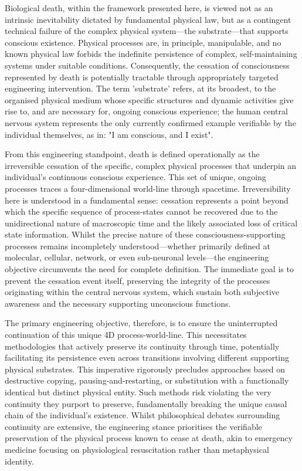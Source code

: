 \documentclass[10pt]{article}
\begin{document}
\begin{sloppypar}
  Biological death, within the framework presented here, is viewed not as an intrinsic inevitability dictated by fundamental physical law, but as a contingent technical failure of the complex physical system—the substrate—that supports conscious existence. Physical processes are, in principle, manipulable, and no known physical law forbids the indefinite persistence of complex, self-maintaining systems under suitable conditions. Consequently, the cessation of consciousness represented by death is potentially tractable through appropriately targeted engineering intervention. The term 'substrate' refers, at its broadest, to the organised physical medium whose specific structures and dynamic activities give rise to, and are necessary for, ongoing conscious experience; the human central nervous system represents the only currently confirmed example verifiable by the individual themselves, as in: "I am conscious, and I exist".

  From this engineering standpoint, death is defined operationally as the irreversible cessation of the specific, complex physical processes that underpin an individual's continuous conscious experience. This set of unique, ongoing processes traces a four-dimensional world-line through spacetime. Irreversibility here is understood in a fundamental sense: cessation represents a point beyond which the specific sequence of process-states cannot be recovered due to the unidirectional nature of macroscopic time and the likely associated loss of critical state information. Whilst the precise nature of these consciousness-supporting processes remains incompletely understood—whether primarily defined at molecular, cellular, network, or even sub-neuronal levels—the engineering objective circumvents the need for complete definition. The immediate goal is to prevent the cessation event itself, preserving the integrity of the processes originating within the central nervous system, which sustain both subjective awareness and the necessary supporting unconscious functions.

  The primary engineering objective, therefore, is to ensure the uninterrupted continuation of this unique 4D process-world-line. This necessitates methodologies that actively preserve its continuity through time, potentially facilitating its persistence even across transitions involving different supporting physical substrates. This imperative rigorously precludes approaches based on destructive copying, pausing-and-restarting, or substitution with a functionally identical but distinct physical entity. Such methods risk violating the very continuity they purport to preserve, fundamentally breaking the unique causal chain of the individual's existence. Whilst philosophical debates surrounding continuity are extensive, the engineering stance prioritises the verifiable preservation of the physical process known to cease at death, akin to emergency medicine focusing on physiological resuscitation rather than metaphysical identity.


\end{sloppypar}
\end{document}
